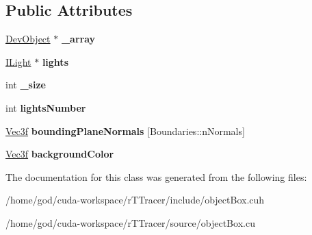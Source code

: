 \subsection*{Public Attributes}
\begin{DoxyCompactItemize}
\item 
\hyperlink{class_dev_object}{Dev\+Object} $\ast$ {\bfseries \+\_\+array}\hypertarget{class_object_box_a9123bf7ece892df29aae846b2dbe8bd0}{}\label{class_object_box_a9123bf7ece892df29aae846b2dbe8bd0}

\item 
\hyperlink{class_i_light}{I\+Light} $\ast$ {\bfseries lights}\hypertarget{class_object_box_abb0e2bdacf5f7e0a4b45388bef4a490f}{}\label{class_object_box_abb0e2bdacf5f7e0a4b45388bef4a490f}

\item 
int {\bfseries \+\_\+size}\hypertarget{class_object_box_a5b8723c68c6d742bc04c601122612615}{}\label{class_object_box_a5b8723c68c6d742bc04c601122612615}

\item 
int {\bfseries lights\+Number}\hypertarget{class_object_box_add9c5ed5d73451037155bd85d53be522}{}\label{class_object_box_add9c5ed5d73451037155bd85d53be522}

\item 
\hyperlink{class_vec3}{Vec3f} {\bfseries bounding\+Plane\+Normals} \mbox{[}Boundaries\+::n\+Normals\mbox{]}\hypertarget{class_object_box_a0afa94fb79fcf89ece053a4f31d01de7}{}\label{class_object_box_a0afa94fb79fcf89ece053a4f31d01de7}

\item 
\hyperlink{class_vec3}{Vec3f} {\bfseries background\+Color}\hypertarget{class_object_box_a5e71a6c5ca56daf46ddf570730433f16}{}\label{class_object_box_a5e71a6c5ca56daf46ddf570730433f16}

\end{DoxyCompactItemize}


The documentation for this class was generated from the following files\+:\begin{DoxyCompactItemize}
\item 
/home/god/cuda-\/workspace/r\+T\+Tracer/include/object\+Box.\+cuh\item 
/home/god/cuda-\/workspace/r\+T\+Tracer/source/object\+Box.\+cu\end{DoxyCompactItemize}
